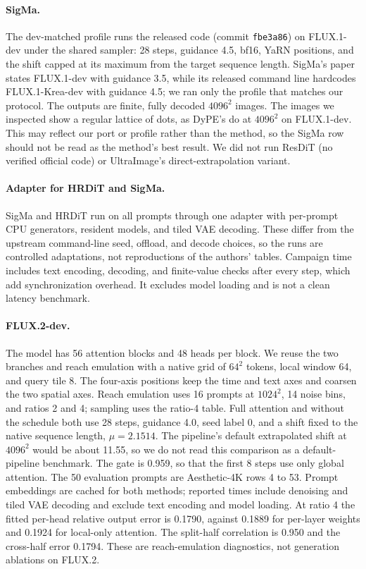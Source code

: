 \paragraph{SigMa.} The dev-matched profile runs the released code (commit \texttt{fbe3a86}) on FLUX.1-dev under the shared sampler: 28 steps, guidance 4.5, bf16, YaRN positions, and the shift capped at its maximum from the target sequence length. SigMa's paper states FLUX.1-dev with guidance 3.5, while its released command line hardcodes FLUX.1-Krea-dev with guidance 4.5; we ran only the profile that matches our protocol. The outputs are finite, fully decoded $4096^2$ images. The images we inspected show a regular lattice of dots, as DyPE's do at $4096^2$ on FLUX.1-dev. This may reflect our port or profile rather than the method, so the SigMa row should not be read as the method's best result. We did not run ResDiT (no verified official code) or UltraImage's direct-extrapolation variant.

\paragraph{Adapter for HRDiT and SigMa.} SigMa and HRDiT run on all \nmain{} prompts through one adapter with per-prompt CPU generators, resident models, and tiled VAE decoding. These differ from the upstream command-line seed, offload, and decode choices, so the runs are controlled adaptations, not reproductions of the authors' tables. Campaign time includes text encoding, decoding, and finite-value checks after every step, which add synchronization overhead. It excludes model loading and is not a clean latency benchmark.

\paragraph{FLUX.2-dev.} The model has 56 attention blocks and 48 heads per block. We reuse the two branches and reach emulation with a native grid of $64^2$ tokens, local window 64, and query tile 8. The four-axis positions keep the time and text axes and coarsen the two spatial axes. Reach emulation uses 16 prompts at $1024^2$, 14 noise bins, and ratios 2 and 4; sampling uses the ratio-4 table. Full attention and \sca{} without the schedule both use 28 steps, guidance 4.0, seed label 0, and a shift fixed to the native sequence length, $\mu=2.1514$. The pipeline's default extrapolated shift at $4096^2$ would be about 11.55, so we do not read this comparison as a default-pipeline benchmark. The gate is 0.959, so that the first 8 steps use only global attention. The 50 evaluation prompts are Aesthetic-4K rows 4 to 53. Prompt embeddings are cached for both methods; reported times include denoising and tiled VAE decoding and exclude text encoding and model loading. At ratio 4 the fitted per-head relative output error is 0.1790, against 0.1889 for per-layer weights and 0.1924 for local-only attention. The split-half correlation is 0.950 and the cross-half error 0.1794. These are reach-emulation diagnostics, not generation ablations on FLUX.2.

